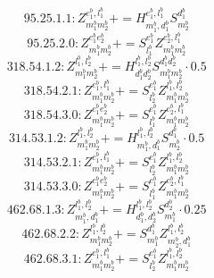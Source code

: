 \documentclass[letterpaper,10pt,fleqn,leqno,onecolumn]{article}
\begin{document}
\begin{equation} \;\;\;\;\;\;  95.25.1.1: Z^{e_{1}^{b},l_{1}^{b}}_{m_{1}^{b}m_{2}^{b}}+=H^{e_{1}^{b},l_{1}^{b}}_{m_{1}^{b},d_{1}^{b}}S^{d_{1}^{b}}_{m_{2}^{b}} \end{equation}
\begin{equation} \;\;\;\;\;\;  95.25.2.0: Z^{e_{1}^{b}e_{2}^{b}}_{m_{1}^{b}m_{2}^{b}}+=S^{e_{1}^{b}}_{l_{1}^{b}}Z^{e_{2}^{b},l_{1}^{b}}_{m_{1}^{b}m_{2}^{b}} \end{equation}
\begin{equation} \;\;\;\;\;\;  318.54.1.2: Z^{l_{1}^{b},l_{2}^{b}}_{m_{1}^{b}m_{2}^{b}}+=H^{l_{1}^{b},l_{2}^{b}}_{d_{1}^{b}d_{2}^{b}}S^{d_{1}^{b}d_{2}^{b}}_{m_{1}^{b}m_{2}^{b}}\cdot 0.5 \end{equation}
\begin{equation} \;\;\;\;\;\;  318.54.2.1: Z^{e_{1}^{b},l_{1}^{b}}_{m_{1}^{b}m_{2}^{b}}+=S^{e_{1}^{b}}_{l_{2}^{b}}Z^{l_{1}^{b},l_{2}^{b}}_{m_{1}^{b}m_{2}^{b}} \end{equation}
\begin{equation} \;\;\;\;\;\;  318.54.3.0: Z^{e_{1}^{b}e_{2}^{b}}_{m_{1}^{b}m_{2}^{b}}+=S^{e_{1}^{b}}_{l_{1}^{b}}Z^{e_{2}^{b},l_{1}^{b}}_{m_{1}^{b}m_{2}^{b}} \end{equation}
\begin{equation} \;\;\;\;\;\;  314.53.1.2: Z^{l_{1}^{b},l_{2}^{b}}_{m_{1}^{b}m_{2}^{b}}+=H^{l_{1}^{b},l_{2}^{b}}_{m_{1}^{b},d_{1}^{b}}S^{d_{1}^{b}}_{m_{2}^{b}}\cdot 0.5 \end{equation}
\begin{equation} \;\;\;\;\;\;  314.53.2.1: Z^{e_{1}^{b},l_{1}^{b}}_{m_{1}^{b}m_{2}^{b}}+=S^{e_{1}^{b}}_{l_{2}^{b}}Z^{l_{1}^{b},l_{2}^{b}}_{m_{1}^{b}m_{2}^{b}} \end{equation}
\begin{equation} \;\;\;\;\;\;  314.53.3.0: Z^{e_{1}^{b}e_{2}^{b}}_{m_{1}^{b}m_{2}^{b}}+=S^{e_{1}^{b}}_{l_{1}^{b}}Z^{e_{2}^{b},l_{1}^{b}}_{m_{1}^{b}m_{2}^{b}} \end{equation}
\begin{equation} \;\;\;\;\;\;  462.68.1.3: Z^{l_{1}^{b},l_{2}^{b}}_{m_{1}^{b},d_{1}^{b}}+=H^{l_{1}^{b},l_{2}^{b}}_{d_{1}^{b},d_{2}^{b}}S^{d_{2}^{b}}_{m_{1}^{b}}\cdot 0.25 \end{equation}
\begin{equation} \;\;\;\;\;\;  462.68.2.2: Z^{l_{1}^{b},l_{2}^{b}}_{m_{1}^{b}m_{2}^{b}}+=S^{d_{1}^{b}}_{m_{1}^{b}}Z^{l_{1}^{b},l_{2}^{b}}_{m_{2}^{b},d_{1}^{b}} \end{equation}
\begin{equation} \;\;\;\;\;\;  462.68.3.1: Z^{e_{1}^{b},l_{1}^{b}}_{m_{1}^{b}m_{2}^{b}}+=S^{e_{1}^{b}}_{l_{2}^{b}}Z^{l_{1}^{b},l_{2}^{b}}_{m_{1}^{b}m_{2}^{b}} \end{equation}
\end{document}
